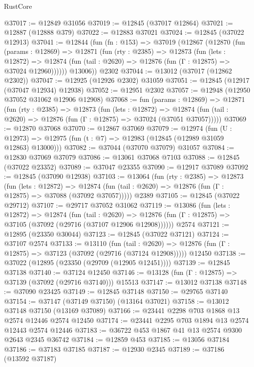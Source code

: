 \begin{lexlean}{RustCore}
\begin{coremodule}
@37017 := @12849 @31056
@37019 := @12845 (@37017 @12864)
@37021 := @12887 (@12888 @379)
@37022 := @12883 @37021
@37024 := @12845 (@37022 @12913)
@37041 := @12844
    (fun (fn : @153) =>
    @37019
      (@12867
        (@12870
          (fun (params : @12869) =>
          @12871
            (fun (rty : @2385) =>
            @12873
              (fun (lets : @12872) =>
              @12874 (fun (tail : @2620) => @12876 (fun (Γ : @12875) => @37024 @12960))))))
        @13006))
    @2302
@37044 := @13012 (@37017 (@12862 @2302))
@37047 := @12925 (@12926 @2302) @31059
@37051 := @12845 (@12917 (@37047 @12934) @12938)
@37052 := @12951 @2302
@37057 := @12948 (@12950 @37052 @31062 @12906 @12908)
@37068 := fun (params : @12869) =>
  @12871
    (fun (rty : @2385) =>
    @12873
      (fun (lets : @12872) =>
      @12874 (fun (tail : @2620) => @12876 (fun (Γ : @12875) => @37024 (@37051 @37057)))))
@37069 := @12870 @37068
@37070 := @12867 @37069
@37079 := @12974
    (fun (U : @12973) => @12975 (fun (t : @7) => @12983 (@12845 (@12989 @31059 @12863) @13000)))
@37082 := @37044 (@37070 @37079) @31057
@37084 := @12830 @37069 @37079
@37086 := @13061 @37068 @7103
@37088 := @12845 (@37022 @23352)
@37089 := @37047 @23355
@37090 := @12917 @37089
@37092 := @12845 (@37090 @12938)
@37103 := @13064
    (fun (rty : @2385) =>
    @12873
      (fun (lets : @12872) =>
      @12874 (fun (tail : @2620) => @12876 (fun (Γ : @12875) => @37088 (@37092 @37057)))))
    @2389
@37105 := @12845 (@37022 @29712)
@37107 := @29717 @37052 @31062
@37119 := @13086
    (fun (lets : @12872) =>
    @12874
      (fun (tail : @2620) =>
      @12876 (fun (Γ : @12875) => @37105 (@37092 (@29716 (@37107 @12906 @12908))))))
    @2574
@37121 := @12895 (@23350 @30044)
@37123 := @12845 (@37022 @37121)
@37124 := @37107 @2574
@37133 := @13110
    (fun (tail : @2620) => @12876 (fun (Γ : @12875) => @37123 (@37092 (@29716 (@37124 @12908)))))
    @12450
@37138 := @37022 (@12895 (@23350 (@29709 (@12905 @12451))))
@37139 := @12845 @37138
@37140 := @37124 @12450
@37146 := @13128 (fun (Γ : @12875) => @37139 (@37092 (@29716 @37140))) @15513
@37147 := @13012 @37138
@37148 := @37090 @23425
@37149 := @12845 @37148
@37150 := @29765 @37140
@37154 := @37147 (@37149 @37150) (@13164 @37021)
@37158 := @13012 @37148 @37150 (@13169 @37089)
@37166 := @23441 @2298 @703 @1868 @13 @2574 @12446 @2574 @12450
@37174 := @23441 @2295 @703 @1894 @13 @2574 @12443 @2574 @12446
@37183 := @36722 @453 @1867 @41 @13 @2574 @9300 @2643 @2345 @36742
@37184 := @12859 @453
@37185 := @13056 @37184
@37186 := @37183 @37185
@37187 := @12930 @2345
@37189 := @37186 (@13592 @37187)

\end{coremodule}
\end{lexlean}
